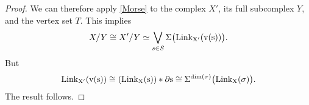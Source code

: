 \documentclass[a4paper]{amsart}
\providecommand{\Link}{\ensuremath\mr{Link}}
\numberwithin{theoremcounter}{section}
\newtheorem{theorem}[theoremauto]{Theorem}
\theoremstyle{definition}
\theoremstyle{remark}
\newcommand{\mr}[1]{{\rm #1}}
\newcommand{\Lk}{\mr{Link}}
\newcommand{\jw}[1]{\marginpar{\tiny\textcolor{violet}{jw: #1}}}
\begin{document}
\begin{proof}
We can therefore apply \autoref{Morse} to the complex $X'$, its full subcomplex $Y$, and the vertex set $T$. This implies
$$X/Y \cong X'/Y \simeq  \bigvee_{s \in S} \Sigma\big( \Link_{X'}( v(s))  \big).$$ 
But
$$ \Link_{X'}( v(s))  \cong ( \Link_{X}(s) ) * \partial s \cong  \Sigma^{\dim(\sigma)} \big( \Link_X(\sigma)\big).  $$
The result follows.
\end{proof}



\begin{comment}
 \jw{This subsection was copy-pasted directly from the document Notes-AdaptingCharneyMorseTheory-AIMZ\textasciicircum4Case. Should edit it. May want to rephrase for simplicial complexes instead of posets}

\begin{theorem}{\bf (Combinatorial Morse Theory).}  \label{Morse} Let $X$ be a poset with $X=F_0 \cup X_1 \cup \dots \cup X_m$ as sets. Let $F_k=F_0 \cup X_1 \cup \dots \cup X_k$. Suppose the following: 
\begin{enumerate}
\item $|F_0|$ is contractible.
\item For $k \geq 1$ then any pair $s,t  \in X_k$ of distinct elements are not comparable.
\item For $k \geq 1$ and $t \in X_k$,  $  |\Lk_X(t) \cap F_{k-1}| \simeq \bigvee S^{d-1}.  $ 
\end{enumerate}
Then $|X|$ is homotopy equivalent to $\bigvee S^d$.
\end{theorem}


\begin{proof}[Proof idea for Theorem \ref{Morse}, from Charney:] Proceed by induction, showing that for $|F_k| \simeq \bigvee S^d$ for all $k \geq 1$. By assumption, 
\begin{align*}
|F_1| &= |F_0| \cup \left( \bigcup_{t \in X_1} \text{cone on }  \left| \Lk_{F_1}(t) \cap F_0  \right| \right) \quad \text{ where } |F_0| \simeq *, \quad \left|\Lk_{F_1}(t) \cap F_0 \right| \simeq S^{d-1},  \\ 
& = \bigvee_{t \in X_1} \text{ suspension on } S^{d-1} \\ 
& = \bigvee S^d
\end{align*}
Now, by inductive hypothesis,  $|F_k|=|F_0 \cup X_1 \cup \dots \cup X_k| \simeq \bigvee S^d$. Then 
\begin{align*}
|F_k| &= |F_{k-1}| \cup \left( \bigcup_{t \in X_k} \text{cone on }  \left| \Lk_{F_k}(t) \cap F_{k-1}  \right| \right) \qquad \text{ where }  \left|\Lk_{F_k}(t) \cap X_0 \right| \simeq S^{d-1}  \\ 
& =  \left( \bigvee S^d  \right) \cup \left( \bigvee_{t \in X_1} \text{ suspension on } S^{d-1} \right)  \qquad \text{ where $S^{d-1} \subseteq S^d$ is contractible,}\\ 
& = \bigvee S^d 
\end{align*}
In particular, $|X| = |F_m| \simeq \bigvee S^d$. 
\end{proof}
\end{comment} 
\end{document}
